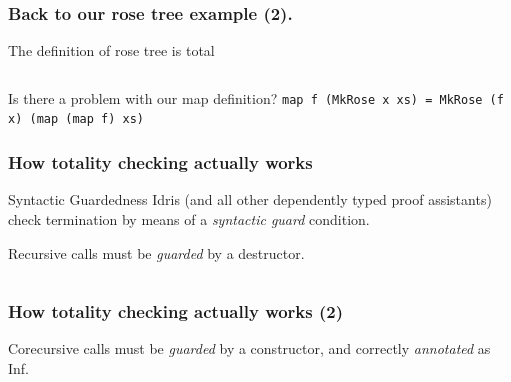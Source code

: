 \documentclass
  [hyperref={colorlinks = true,linkcolor = blue, 
             citecolor = blue, urlcolor = blue}
  ]{beamer}
\begin{document}
\begin{frame}[fragile]
\frametitle{Back to our rose tree example (2).}
\begin{block}{The definition of rose tree is total}
  \inputminted{idris}{../Code/src/TotalMapList.idr}
\end{block}
\begin{block}{Is there a problem with our map definition?}
\texttt{map f (MkRose x xs) = MkRose (f x) (map (map f) xs)}
\end{block}
\end{frame}

\begin{frame}[fragile]
  \frametitle{How totality checking actually works}
  \begin{block}{Syntactic Guardedness}
  Idris (and all other dependently typed proof assistants) check
  termination by means of a \textit{syntactic guard} condition.
  \end{block}
  \begin{block}{Recursive calls must be \textit{guarded} by a
  destructor.}
    \inputminted{idris}{../Code/src/GuardedRecursiveCall.idr}
  \end{block}
\end{frame}

\begin{frame}[fragile]
  \frametitle{How totality checking actually works (2)}
  \begin{block}{Corecursive calls must be \textit{guarded} by a
  constructor, and correctly \textit{annotated} as Inf.}
    \inputminted{idris}{../Code/src/GuardedCorecursiveCall.idr}
  \end{block}
\end{frame}
\end{document}
